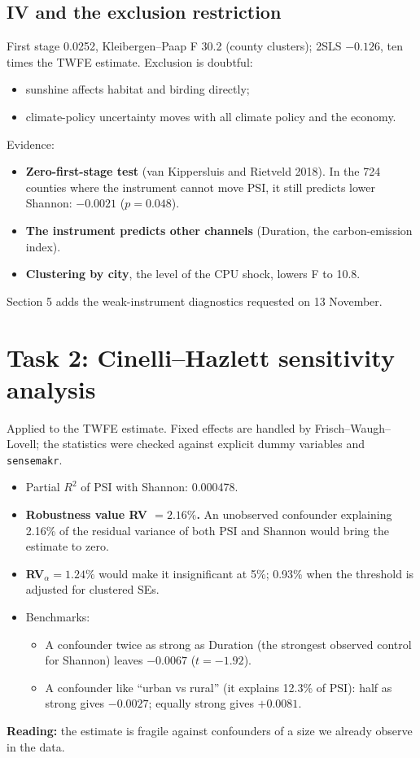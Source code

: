 \documentclass[11pt]{article}
\begin{document}
\subsection{IV and the exclusion restriction}
First stage 0.0252, Kleibergen--Paap F 30.2 (county clusters); 2SLS $-0.126$, ten times the TWFE estimate. Exclusion is doubtful:
\begin{itemize}
\item sunshine affects habitat and birding directly;
\item climate-policy uncertainty moves with all climate policy and the economy.
\end{itemize}
Evidence:
\begin{itemize}
\item \textbf{Zero-first-stage test} (van Kippersluis and Rietveld 2018). In the 724 counties where the instrument cannot move PSI, it still predicts lower Shannon: $-0.0021$ ($p=0.048$).
\item \textbf{The instrument predicts other channels} (Duration, the carbon-emission index).
\item \textbf{Clustering by city}, the level of the CPU shock, lowers F to 10.8.
\end{itemize}
Section 5 adds the weak-instrument diagnostics requested on 13 November.

\section{Task 2: Cinelli--Hazlett sensitivity analysis}
Applied to the TWFE estimate. Fixed effects are handled by Frisch--Waugh--Lovell; the statistics were checked against explicit dummy variables and \texttt{sensemakr}.
\begin{itemize}
\item Partial $R^2$ of PSI with Shannon: 0.000478.
\item \textbf{Robustness value RV $=2.16\%$.} An unobserved confounder explaining 2.16\% of the residual variance of both PSI and Shannon would bring the estimate to zero.
\item \textbf{RV$_\alpha=1.24\%$} would make it insignificant at 5\%; 0.93\% when the threshold is adjusted for clustered SEs.
\item Benchmarks:
  \begin{itemize}
  \item A confounder twice as strong as Duration (the strongest observed control for Shannon) leaves $-0.0067$ ($t=-1.92$).
  \item A confounder like ``urban vs rural'' (it explains 12.3\% of PSI): half as strong gives $-0.0027$; equally strong gives $+0.0081$.
  \end{itemize}
\end{itemize}
\textbf{Reading:} the estimate is fragile against confounders of a size we already observe in the data.
\end{document}
